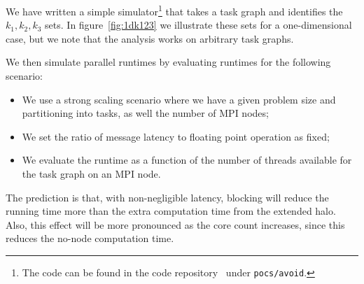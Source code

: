 \documentclass[11pt,fleqn,preprint]{impreport}
\begin{document}
We have written a simple simulator\footnote{The code can be found in
  the code repository~\cite{IMPcode-repo} under {\tt pocs/avoid}.} that takes a task graph and
identifies the $k_1,k_2,k_3$ sets. In figure~\ref{fig:1dk123} we
illustrate these sets for a one-dimensional case, but we note that the
analysis works on arbitrary task graphs.

We then simulate parallel runtimes by evaluating runtimes for the
following scenario:
\begin{itemize}
\item We use a strong scaling scenario where we have a given problem
  size and partitioning into tasks, as well the number of MPI nodes;
\item We set the ratio of message latency to floating point operation
  as fixed;
\item We evaluate the runtime as a function of the number of threads
  available for the task graph on an MPI node.
\end{itemize}
The prediction is that, with non-negligible latency, blocking will
reduce the running time more than the extra computation time from the
extended halo. Also, this effect will be more pronounced as the core
count increases, since this reduces the no-node computation time.
\end{document}
